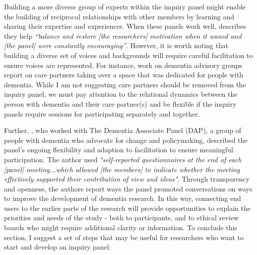 Building a more diverse group of experts within the inquiry panel might enable the building of reciprocal relationships with other members by learning and sharing their expertise and experiences. When these panels work well, \cite{appleton2011critical} describes they help \textit{``balance and restore [the researchers] motivation when it waned and [the panel] were constantly encouraging''}. However, it is worth noting that building a diverse set of voices and backgrounds will require careful facilitation to ensure voices are represented. For instance, \cite{wiersma2016creating} work on dementia advisory groups report on care partners taking over a space that was dedicated for people with dementia. While I am not suggesting care partners should be removed from the inquiry panel, we must pay attention to the relational dynamics between the person with dementia and their care partner(s) and be flexible if the inquiry panels require sessions for participating separately and together.

Further, \cite{innes2021s}, who worked with The Dementia Associate Panel (DAP), a group of people with dementia who advocate for change and policymaking, described the panel's ongoing flexibility and adaption to facilitation to ensure meaningful participation. The author used \textit{"self-reported questionnaires at the end of each [panel] meeting...which allowed [the members] to indicate whether the meeting effectively supported their contribution of view and ideas"}. Through transparency and openness, the authors report ways the panel promoted conversations on ways to improve the development of dementia research. In this way, connecting end users to the earlier parts of the research will provide opportunities to explain the priorities and needs of the study - both to participants, and to ethical review boards who might require additional clarity or information. To conclude this section, I suggest a set of steps that may be useful for researchers who want to start and develop an inquiry panel:


